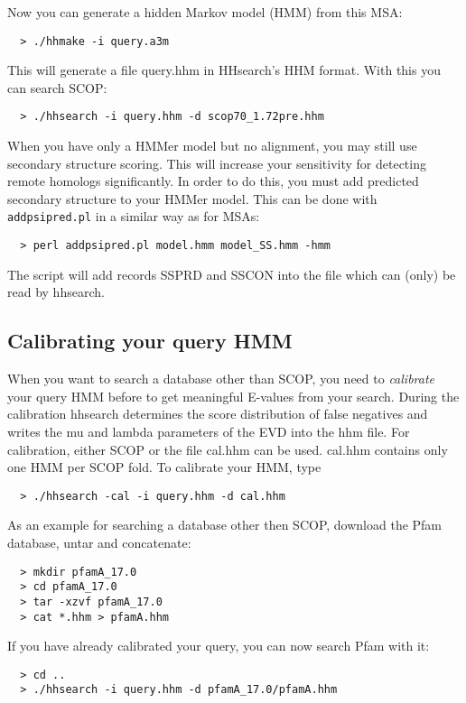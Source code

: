 \documentclass[11pt,a4paper]{article}
\begin{document}
Now you can generate a hidden Markov model (HMM) from this MSA:
\begin{verbatim}
  > ./hhmake -i query.a3m
\end{verbatim}

This will generate a file query.hhm in HHsearch's HHM format. With this 
you can search SCOP: 
\begin{verbatim}
  > ./hhsearch -i query.hhm -d scop70_1.72pre.hhm
\end{verbatim}

When you have only a HMMer model but no alignment, you may still use secondary 
structure scoring. This will increase your sensitivity for detecting remote homologs
significantly. In order to do this, you must add predicted secondary structure to your
HMMer model. This can be done with \verb`addpsipred.pl` in a similar way as for MSAs:

\begin{verbatim}
  > perl addpsipred.pl model.hmm model_SS.hmm -hmm
\end{verbatim}

The script will add records SSPRD and SSCON into the file which can (only) be read by 
hhsearch.

\subsection{Calibrating your query HMM}

When you want to search a database other than SCOP, you need to \emph{calibrate} your query
HMM before to get meaningful E-values from your search. During the calibration
hhsearch determines the score distribution of false negatives and writes the mu and 
lambda parameters of the EVD into the hhm file. For calibration, either SCOP or the 
file cal.hhm can be used. cal.hhm contains only one HMM per SCOP fold. To calibrate 
your HMM, type
\begin{verbatim}
  > ./hhsearch -cal -i query.hhm -d cal.hhm
\end{verbatim}

As an example for searching a database other then SCOP, download the Pfam database, 
untar and concatenate: 
\begin{verbatim}
  > mkdir pfamA_17.0
  > cd pfamA_17.0
  > tar -xzvf pfamA_17.0
  > cat *.hhm > pfamA.hhm
\end{verbatim}

If you have already calibrated your query, you can now search Pfam with it:
\begin{verbatim}
  > cd ..
  > ./hhsearch -i query.hhm -d pfamA_17.0/pfamA.hhm 
\end{verbatim}
\end{document}
